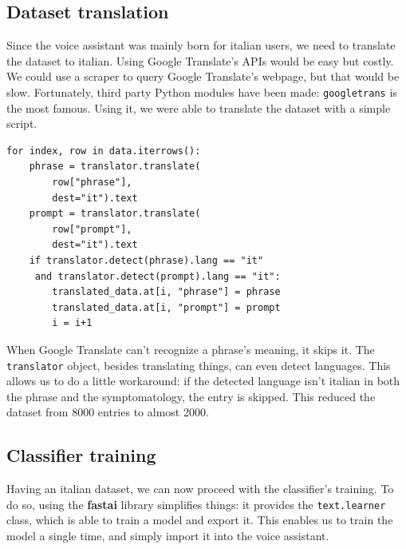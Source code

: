 \documentclass[conference]{IEEEtran}
\begin{document}
\subsection{Dataset translation}
Since the voice assistant was mainly born for italian users, we need to translate the dataset to italian. Using Google Translate's APIs would be easy but costly. We could use a scraper to query Google Translate's webpage, but that would be slow. Fortunately, third party Python modules have been made: \texttt{googletrans} is the most famous. Using it, we were able to translate the dataset with a simple script.
\begin{verbatim}
for index, row in data.iterrows():
    phrase = translator.translate(
        row["phrase"], 
        dest="it").text
    prompt = translator.translate(
        row["prompt"],
        dest="it").text
    if translator.detect(phrase).lang == "it"
     and translator.detect(prompt).lang == "it":
        translated_data.at[i, "phrase"] = phrase 
        translated_data.at[i, "prompt"] = prompt 
        i = i+1
\end{verbatim}
When Google Translate can't recognize a phrase's meaning, it skips it. The \texttt{translator} object, besides translating things, can even detect languages. This allows us to do a little workaround: if the detected language isn't italian in both the phrase and the symptomatology, the entry is skipped. This reduced the dataset from 8000 entries to almost 2000.
\subsection{Classifier training}
Having an italian dataset, we can now proceed with the classifier's training. To do so, using the \textbf{fastai} library simplifies things: it provides the \texttt{text.learner} class, which is able to train a model and export it. This enables us to train the model a single time, and simply import it into the voice assistant.
\end{document}
